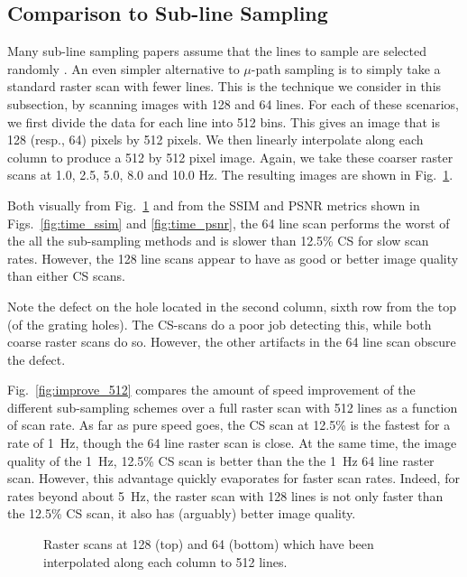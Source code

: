 \documentclass[journal]{IEEEtran}
\begin{document}
\subsection{Comparison to Sub-line Sampling} \label{sec:cp_subline}
Many sub-line sampling papers assume that the lines to sample are
selected randomly \cite{han_optimal_2018, Luo_nano_2015}. An even
simpler alternative to $\mu$-path sampling is to simply take a
standard raster scan with fewer lines. This is the technique we
consider in this subsection, by scanning images with 128 and 64 lines.
For each of these scenarios, we first divide the data for each line
into 512 bins. This gives an image that is 128 (resp., 64) pixels by
512 pixels. We then linearly interpolate along each column to produce
a 512 by 512 pixel image. Again, we take these coarser raster scans at
1.0, 2.5, 5.0, 8.0 and 10.0 Hz. The resulting images are shown in
Fig.~\ref{fig:results_subline_images}.

Both visually from Fig.~\ref{fig:results_subline_images} and from the SSIM and PSNR metrics shown in 
Figs.~\ref{fig:time_ssim} and \ref{fig:time_psnr}, the 64 line
scan performs the worst of the all the sub-sampling methods and is
slower than 12.5\% CS for slow scan rates. However, the 128 line scans
appear to have as good or better image quality than either CS scans.

Note the defect on the hole located in the second column, sixth row
from the top (of the grating holes). The CS-scans do a poor job
detecting this, while both coarse raster scans do so. However, the
other artifacts in the 64 line scan obscure the defect.

Fig.~\ref{fig:improve_512} compares the amount of speed improvement of
the different sub-sampling schemes over a full raster scan with 512
lines as a function of scan rate. As far as pure speed goes, the CS
scan at 12.5\% is the fastest for a rate of 1~Hz, though the 64 line
raster scan is close. At the same time, the image quality of the 1~Hz,
12.5\% CS scan is better than the the 1~Hz 64 line raster scan.
However, this advantage quickly evaporates for faster scan rates.
Indeed, for rates beyond about 5~Hz, the raster scan with 128 lines is
not only faster than the 12.5\% CS scan, it also has (arguably) better
image quality.

\begin{figure}
  \centering
  
  \caption{Raster scans at 128 (top) and 64 (bottom) which have been
    interpolated along each column to 512 lines.}
  \label{fig:results_subline_images}
\end{figure}
\end{document}
